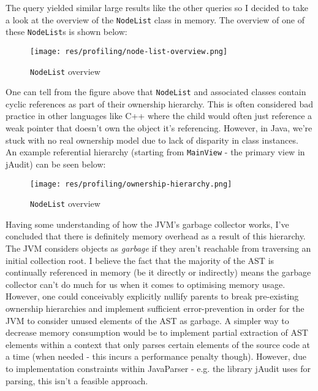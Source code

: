 \documentclass[9pt]{article}
\begin{document}
			The query yielded similar large results like the other queries so I
			decided to take a look at the overview of the \texttt{NodeList} class in
			memory. The overview of one of these \texttt{NodeList}s is shown
			below:\\

			\begin{figure}[H]
				\centering
				\texttt{[image: res/profiling/node-list-overview.png]}
				\caption{\texttt{NodeList} overview}
			\end{figure}
			
			One can tell from the figure above that \texttt{NodeList} and
			associated classes contain cyclic references as part of their
			ownership hierarchy. This is often considered bad practice in other
			languages like C++ where the child would often just reference a weak
			pointer that doesn't own the object it's referencing. However, in
			Java, we're stuck with no real ownership model due to lack of
			disparity in class instances.\\

			An example referential hierarchy (starting from \texttt{MainView} -
			the primary view in jAudit) can be seen below:\\

			\begin{figure}[H]
				\centering
				\texttt{[image: res/profiling/ownership-hierarchy.png]}
				\caption{\texttt{NodeList} overview}
			\end{figure}

			Having some understanding of how the JVM's garbage collector works,
			I've concluded that there is definitely memory overhead as a result
			of this hierarchy. The JVM considers objects as \textit{garbage} if
			they aren't reachable from traversing an initial collection root. I
			believe the fact that the majority of the AST is continually
			referenced in memory (be it directly or indirectly) means the
			garbage collector can't do much for us when it comes to optimising
			memory usage. However, one could conceivably explicitly nullify
			parents to break pre-existing ownership hierarchies and implement
			sufficient error-prevention in order for the JVM to consider unused
			elements of the AST as garbage. A simpler way to decrease memory
			consumption would be to implement partial extraction of AST elements
			within a context that only parses certain elements of the source
			code at a time (when needed - this incurs a performance penalty
			though). However, due to implementation constraints within
			JavaParser - e.g. the library jAudit uses for parsing, this isn't a
			feasible approach.\\
\end{document}
